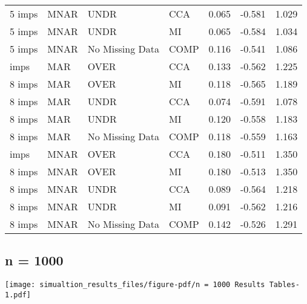 \documentclass[
  letterpaper,
  DIV=11,
  numbers=noendperiod]{scrartcl}
\begin{document}
\begin{tabular}[t]{llllrrr}
5 imps & MNAR & UNDR & CCA & 0.065 & -0.581 & 1.029\\
5 imps & MNAR & UNDR & MI & 0.065 & -0.584 & 1.034\\
5 imps & MNAR & No Missing Data & COMP & 0.116 & -0.541 & 1.086\\
\addlinespace
8 imps & MAR & OVER & CCA & 0.133 & -0.562 & 1.225\\
8 imps & MAR & OVER & MI & 0.118 & -0.565 & 1.189\\
8 imps & MAR & UNDR & CCA & 0.074 & -0.591 & 1.078\\
8 imps & MAR & UNDR & MI & 0.120 & -0.558 & 1.183\\
8 imps & MAR & No Missing Data & COMP & 0.118 & -0.559 & 1.163\\
\addlinespace
8 imps & MNAR & OVER & CCA & 0.180 & -0.511 & 1.350\\
8 imps & MNAR & OVER & MI & 0.180 & -0.513 & 1.350\\
8 imps & MNAR & UNDR & CCA & 0.089 & -0.564 & 1.218\\
8 imps & MNAR & UNDR & MI & 0.091 & -0.562 & 1.216\\
8 imps & MNAR & No Missing Data & COMP & 0.142 & -0.526 & 1.291\\
\bottomrule
\end{tabular}

\hypertarget{n-1000}{%
\subsection{n = 1000}\label{n-1000}}

\texttt{[image: simualtion\_results\_files/figure-pdf/n = 1000 Results Tables-1.pdf]}
\end{document}
